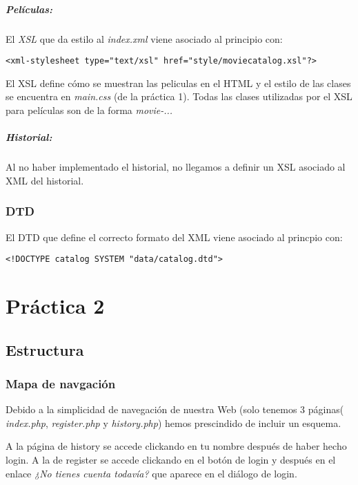 \documentclass{apuntes}
\begin{document}
\paragraph{Películas: }
El \textit{XSL} que da estilo al \textit{index.xml} viene asociado al principio con:
\begin{verbatim}
<xml-stylesheet type="text/xsl" href="style/moviecatalog.xsl"?>
\end{verbatim}

El XSL define cómo se muestran las peliculas en el HTML y el estilo de las clases se encuentra en \textit{main.css} (de la práctica 1). Todas las clases utilizadas por el XSL para películas son de la forma \textit{movie-...}


\paragraph{Historial: }
Al no haber implementado el historial, no llegamos a definir un XSL asociado al XML del historial.

\subsection{DTD}

El DTD que define el correcto formato del XML viene asociado al princpio con:

\begin{verbatim}
<!DOCTYPE catalog SYSTEM "data/catalog.dtd">
\end{verbatim}


\chapter{Práctica 2}


\section{Estructura}

\subsection{Mapa de navgación}

Debido a la simplicidad de navegación de nuestra Web (solo tenemos 3 páginas( \textit{index.php}, \textit{register.php} y \textit{history.php}) hemos prescindido de incluir un esquema.

A la página de history se accede clickando en tu nombre después de haber hecho login. A la de register se accede clickando en el botón de login y después en el enlace \textit{¿No tienes cuenta todavía?} que aparece en el diálogo de login. 
\end{document}
